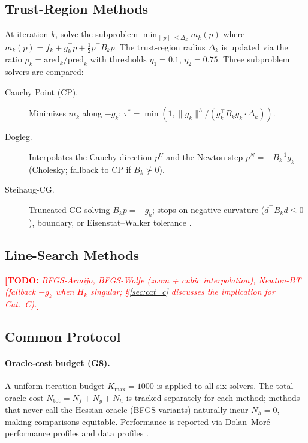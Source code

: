 \documentclass[11pt,a4paper]{article}
\newcommand{\TODO}[1]{\textcolor{red}{\textbf{[TODO:} \textit{#1}\textbf{]}}}
\newcommand{\TAB}[1]{%
  \begin{center}
    \fbox{\parbox{0.85\linewidth}{\centering\vspace{1.2em}
      \small\textit{[Table placeholder: #1]}\vspace{1.2em}}}
  \end{center}}
\newcommand{\norm}[1]{\lVert#1\rVert}
\newcommand{\Ntot}{N_{\mathrm{tot}}}
\newcommand{\Kmax}{K_{\max}}
\newcommand{\mk}{m_k}
\newcommand{\gk}{g_k}
\newcommand{\Bk}{B_k}
\newcommand{\dk}{\Delta_k}
\newcommand{\SteihaugCG}{Steihaug-CG\xspace}
\begin{document}
\subsection{Trust-Region Methods}

At iteration $k$, solve the subproblem
$\min_{\norm{p} \le \dk} \mk(p)$
where $\mk(p) = f_k + \gk^\top p + \tfrac{1}{2} p^\top \Bk p$.
The trust-region radius $\dk$ is updated via the ratio
$\rho_k = \mathrm{ared}_k / \mathrm{pred}_k$
with thresholds $\eta_1 = 0.1$, $\eta_2 = 0.75$.
Three subproblem solvers are compared:

\begin{description}
  \item[Cauchy Point (CP).] Minimizes $\mk$ along $-\gk$;
        $\tau^* = \min(1, \norm{\gk}^3 / (\gk^\top\Bk\gk \cdot \dk))$.
  \item[Dogleg.] Interpolates the Cauchy direction $p^U$ and the Newton
        step $p^N = -\Bk^{-1}\gk$ (Cholesky; fallback to CP if $\Bk \not\succ 0$).
  \item[\SteihaugCG.] Truncated CG solving $\Bk p = -\gk$; stops on
        negative curvature ($d^\top\Bk d \le 0$), boundary, or
        Eisenstat--Walker tolerance \citep{Steihaug83}.
\end{description}

\subsection{Line-Search Methods}

\TODO{BFGS-Armijo, BFGS-Wolfe (zoom + cubic interpolation), Newton-BT
(fallback $-g_k$ when $H_k$ singular; §\ref{sec:cat_c} discusses the
implication for Cat.~C).}

\subsection{Common Protocol}

\TAB{Table: 6 methods --- compact parameter table.
Rows: method name, line/TR, Kmax=1000 (uniform, G8), tol=1e-6,
oracle cost Ntot=Nf+Ng+Nh.}

\paragraph{Oracle-cost budget (G8).}
A uniform iteration budget $\Kmax = 1000$ is applied to all six solvers.
The total oracle cost $\Ntot = N_f + N_g + N_h$ is tracked separately for
each method; methods that never call the Hessian oracle (BFGS variants)
naturally incur $N_h = 0$, making comparisons equitable.
Performance is reported via Dolan--Moré performance profiles
\citep{DolanMore2002} and data profiles \citep{MoreWild2009}.
\end{document}
